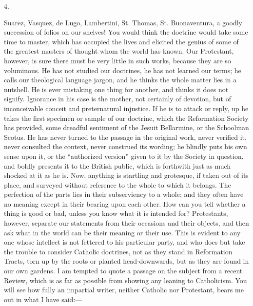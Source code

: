 4.

Suarez, Vasquez, de Lugo, Lambertini, St. Thomas, St.
Buonaventura, a goodly succession of folios on our
shelves! You would think the doctrine would take some
time to master, which has occupied the lives and elicited
the genius of some of the greatest masters of thought
whom the world has known. Our Protestant, however, is
sure there must be very little in such works, because
they are so voluminous. He has not studied our doctrines,
he has not learned our terms; he calls our theological
language jargon, and he thinks the whole matter lies in a
nutshell. He is ever mistaking one thing for another, and
thinks it does not signify. Ignorance in his case is the
mother, not certainly of devotion, but of inconceivable
conceit and preternatural injustice. If he is to attack
or reply, up he takes the first specimen or sample of our
doctrine, which the Reformation Society has provided,
some dreadful sentiment of the Jesuit Bellarmine, or the
Schoolman Scotus. He has never turned to the passage in
the original work, never verified it, never consulted the
context, never construed its wording; he blindly puts his
own sense upon it, or the ``authorized version''
given to it by the Society in question, and boldly
presents it to the British public, which is forthwith
just as much shocked at it as he is. Now, anything is
startling and grotesque, if taken out of its place, and
surveyed without reference to the whole to which it
belongs. The perfection of the parts lies in their
subserviency to a whole; and they often have no meaning
except in their bearing upon each other. How can you tell
whether a thing is good or bad, unless you know what it
is intended for? Protestants, however, separate our
statements from their occasions and their objects, and
then ask what in the world can be their meaning or their
use. This is evident to any one whose intellect is not
fettered to his particular party, and who does but take
the trouble to consider Catholic doctrines, not as they
stand in Reformation Tracts, torn up by the roots or
planted head-downwards, but as they are found in our own
gardens. I am tempted to quote a passage on the subject
from a recent Review, which is as far as possible from
showing any leaning to Catholicism. You will see how
fully an impartial writer, neither Catholic nor
Protestant, bears me out in what I have said:—

